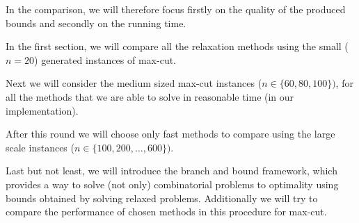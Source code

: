 \documentclass[12pt]{book}
\theoremstyle{definition}
\begin{document}
In the comparison, we will therefore focus firstly on the quality of the produced bounds and secondly on the running time.

In the first section, we will compare all the relaxation methods using the small ($n=20$) generated instances of max-cut. 

Next we will consider the medium sized max-cut instances ($n\in\{60, 80, 100\})$, for all the methods that we are able to solve in reasonable time  (in our implementation).

After this round we will choose only fast methods to compare using the large scale instances ($n\in\{100,200,\dots, 600\})$. 


Last but not least, we will introduce the branch and bound framework, which provides a way to solve (not only) combinatorial problems to optimality using bounds obtained by solving relaxed problems. Additionally we will try to compare the performance of chosen methods in this procedure for max-cut.
\end{document}
